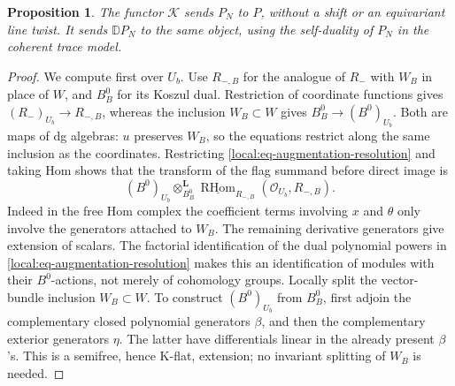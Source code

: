 \documentclass[11pt]{article}
\numberwithin{equation}{section}
\newtheorem{proposition}[theorem]{Proposition}
\theoremstyle{definition}
\theoremstyle{remark}
\newcommand{\cO}{\mathcal O}
\newcommand{\RHom}{\operatorname{RHom}}
\begin{document}
\begin{proposition}\label{local:flag-image}
The functor $\mathcal K$ sends $P_N$ to $P$, without a shift or
an equivariant line twist.  It sends $\mathbb D P_N$ to the same
object, using the self-duality of $P_N$ in the coherent trace model.
\end{proposition}

\begin{proof}
We compute first over $U_b$.  Use $R_{-,B}$ for the analogue of
$R_-$ with $W_B$ in place of $W$, and $B_B^0$ for its Koszul dual.
Restriction of coordinate functions gives
$(R_-)_{U_b}\to R_{-,B}$, whereas the inclusion $W_B\subset W$
gives $B_B^0\to(B^0)_{U_b}$.  Both are maps of dg algebras:
$u$ preserves $W_B$, so the equations restrict along the same
inclusion as the coordinates.  Restricting
\eqref{local:eq-augmentation-resolution} and taking Hom shows
that the transform of the flag summand before direct image is
\begin{equation}\label{local:eq-flag-base-change}
 (B^0)_{U_b}\otimes_{B_B^0}^{\mathbf L}
       \underline{\RHom}_{R_{-,B}}(\cO_{U_b},R_{-,B}).
\end{equation}
Indeed in the free Hom complex the coefficient terms involving
$x$ and $\theta$ only involve the generators attached to $W_B$.
The remaining derivative generators give extension of scalars.
The factorial identification of the dual polynomial powers in
\eqref{local:eq-augmentation-resolution} makes this an
identification of modules with their $B^0$-actions, not merely of
cohomology groups.  Locally split the vector-bundle inclusion
$W_B\subset W$.  To construct $(B^0)_{U_b}$ from $B_B^0$, first
adjoin the complementary closed polynomial generators $\beta$,
and then the complementary exterior generators $\eta$.  The
latter have differentials linear in the already present $\beta$'s.
This is a semifree, hence K-flat, extension; no invariant splitting
of $W_B$ is needed.


\end{proof}
\end{document}
